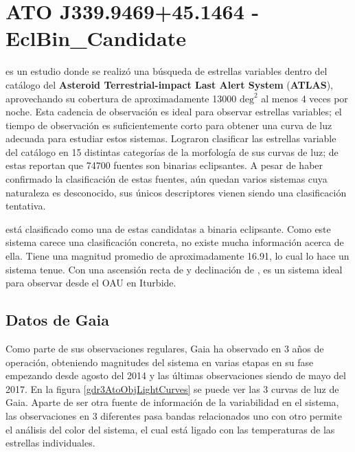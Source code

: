 \section{ATO J339.9469+45.1464 - EclBin\_Candidate}

\citet{atlasATOObjectDiscovery} es un estudio donde se realizó una búsqueda de
estrellas variables dentro del catálogo del \textbf{Asteroid Terrestrial-impact
Last Alert System} (\textbf{ATLAS}), aprovechando su cobertura de
aproximadamente \num{13000} $\mathrm{deg}^2$ al menos 4 veces por noche. Esta
cadencia de observación es ideal para observar estrellas variables; el tiempo de
observación es suficientemente corto para obtener una curva de luz adecuada para
estudiar estos sistemas. Lograron clasificar las estrellas variable del catálogo
en 15 distintas categorías de la morfología de sus curvas de luz; de estas
reportan que \num{74700} fuentes son binarias eclipsantes. A pesar de haber
confirmado la clasificación de estas fuentes, aún quedan varios sistemas cuya
naturaleza es desconocido, sus únicos descriptores vienen siendo una
clasificación tentativa.

\textbf{\atoObjId} está clasificado como una de estas candidatas a binaria
eclipsante. Como este sistema carece una clasificación concreta, no existe mucha
información acerca de ella. Tiene una magnitud promedio de aproximadamente
\num{16.91}, lo cual lo hace un sistema tenue. Con una ascensión recta de
 y declinación de , \textbf{\atoObjId}
es un sistema ideal para observar desde el OAU en Iturbide.

\newpage

\subsection{Datos de Gaia}

Como parte de sus observaciones regulares, Gaia ha observado \atoObjId en 3 años
de operación, obteniendo magnitudes del sistema en varias etapas en su fase
empezando desde agosto del 2014 y las últimas observaciones siendo de mayo del
2017. En la figura \ref{gdr3AtoObjLightCurves} se puede ver las 3 curvas de luz
de Gaia. Aparte de ser otra fuente de información de la variabilidad en el
sistema, las observaciones en 3 diferentes pasa bandas relacionados uno con otro
permite el análisis del color del sistema, el cual está ligado con las
temperaturas de las estrellas individuales.

